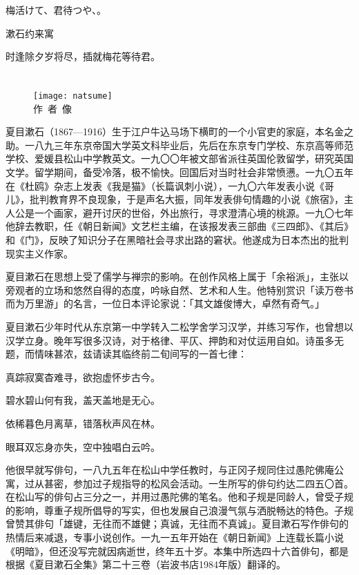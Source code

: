 \begin{haiku}
    {\FH 梅活けて、君待つや、。}

    {\FK 漱石约来寓}

    {\FK 时逢除夕岁将尽，插就梅花等待君。}
\end{haiku}

\chapter[{\FM 夏目漱石}]{\FM {}}

\begin{center}
    \begin{figure}
        \centering
        \texttt{[image: natsume]}\\[1em]
        \large{\FS 作~者~像}
    \end{figure}
\end{center}

\newpage

{\FS
    夏目漱石（1867—1916）生于江户牛込马场下横町的一个小官吏的家庭，本名金之助。一八九三年东京帝国大学英文科毕业后，先后在东京专门学校、东京高等师范学校、爱媛县松山中学教英文。一九〇〇年被文部省派往英国伦敦留学，研究英国文学。留学期间，备受冷落，极不愉快。回国后对当时社会非常愤懑。一九〇五年在《杜鸥》杂志上发表《我是猫》（长篇讽刺小说），一九〇六年发表小说《哥儿》，批判教育界不良现象，于是声名大振，同年发表俳句情趣的小说《旅宿》，主人公是一个画家，避开讨厌的世俗，外出旅行，寻求澄清心境的桃源。一九〇七年他辞去教职，任《朝日新闻》文艺栏主编，在该报发表三部曲《三四郎》、《其后》和《门》，反映了知识分子在黑暗社会寻求出路的窘状。他遂成为日本杰出的批判现实主义作家。

    夏目漱石在思想上受了儒学与禅宗的影响。在创作风格上属于「余裕派」，主张以旁观者的立场和悠然自得的态度，吟咏自然、艺术和人生。他特别赏识「读万卷书而为万里游」的名言，一位日本评论家说：「其文雄俊博大，卓然有奇气。」

    夏目漱石少年时代从东京第一中学转入二松学舍学习汉学，并练习写作，也曾想以汉学立身。晚年写很多汉诗，对于格律、平仄、押韵和对仗运用自如。诗虽多无题，而情味甚浓，兹请读其临终前二旬间写的一首七律：
    \begin{center}
        真踪寂寞杳难寻，欲抱虚怀步古今。

        碧水碧山何有我，盖天盖地是无心。

        依稀暮色月离草，错落秋声风在林。

        眼耳双忘身亦失，空中独唱白云吟。
    \end{center}

    他很早就写俳句，一八九五年在松山中学任教时，与正冈子规同住过愚陀佛庵公寓，过从甚密，参加过子规指导的松风会活动。一生所写的俳句约达二四五〇首。在松山写的俳句占三分之一，并用过愚陀佛的笔名。他和子规是同龄人，曾受子规的影响，尊重子规所倡导的写实，但也发展自己浪漫气氛与洒脱畅达的特色。子规曾赞其俳句「雄键，无往而不雄健；真诚，无往而不真诚」。夏目漱石写作俳句的热情后来减退，专事小说创作。一九一五年开始在《朝日新闻》上连载长篇小说《明暗》，但还没写完就因病逝世，终年五十岁。本集中所选四十六首俳句，都是根据《夏目漱石全集》第二十三卷（岩波书店1984年版）翻译的。
}

